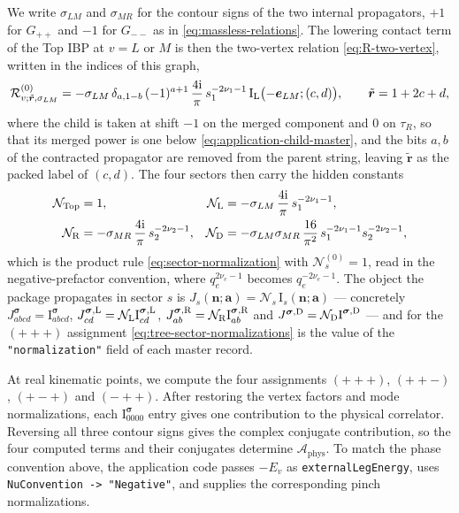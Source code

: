 \documentclass[11pt,a4paper]{article}
\newcommand{\ii}{\mathrm i}
\newcommand{\cR}{\mathcal R}
\newcommand{\cN}{\mathcal N}
\begin{document}
We write $\sigma_{LM}$ and $\sigma_{MR}$ for the contour signs of the two internal propagators,
$+1$ for $G_{++}$ and $-1$ for $G_{--}$ as in \eqref{eq:massless-relations}. The lowering contact
term of the Top IBP at $v=L$ or $M$ is then the two-vertex relation \eqref{eq:R-two-vertex},
written in the indices of this graph,
\begin{equation}
  \cR^{(0)}_{v;\tilde{\bm r},\sigma_{LM}}
  =-\sigma_{LM}\,\delta_{a,1-b}\,(-1)^{a+1}\,\frac{4\ii}{\pi}\,s_1^{-2\nu_1-1}\,
   \text{I}_{\rm L}\bigl(-\bm e_{LM};(c,d)\bigr),
  \qquad \tilde{\bm r}=1+2c+d,
  \label{eq:tree-contact-term}
\end{equation}
where the child is taken at shift $-1$ on the merged component and $0$ on $\tau_R$, so that its
merged power is one below \eqref{eq:application-child-master}, and the bits $a,b$ of the contracted
propagator are removed from the parent string, leaving $\tilde{\bm r}$ as the packed label of $(c,d)$.
The four sectors then carry the hidden constants
\begin{equation}
  \begin{aligned}
  \cN_{\rm Top}&=1, & \cN_{\rm L}&=-\sigma_{LM}\,\frac{4\ii}{\pi}\,s_1^{-2\nu_1-1},\\
  \cN_{\rm R}&=-\sigma_{MR}\,\frac{4\ii}{\pi}\,s_2^{-2\nu_2-1}, &
  \cN_{\rm D}&=-\sigma_{LM}\sigma_{MR}\,\frac{16}{\pi^2}\,s_1^{-2\nu_1-1}s_2^{-2\nu_2-1},
  \end{aligned}
  \label{eq:tree-sector-normalizations}
\end{equation}
which is the product rule \eqref{eq:sector-normalization} with $\cN_s^{(0)}=1$, read in the
negative-prefactor convention, where $q_e^{2\nu_e-1}$ becomes $q_e^{-2\nu_e-1}$. The object the
package propagates in sector $s$ is $J_s(\bm n;\bm a)=\cN_s\,\text{I}_s(\bm n;\bm a)$ ---
concretely $J^{\boldsymbol\sigma}_{abcd}=\text{I}^{\boldsymbol\sigma}_{abcd}$,
$J^{\boldsymbol\sigma,{\rm L}}_{cd}=\cN_{\rm L}\text{I}^{\boldsymbol\sigma,{\rm L}}_{cd}$,
$J^{\boldsymbol\sigma,{\rm R}}_{ab}=\cN_{\rm R}\text{I}^{\boldsymbol\sigma,{\rm R}}_{ab}$ and
$J^{\boldsymbol\sigma,{\rm D}}=\cN_{\rm D}\text{I}^{\boldsymbol\sigma,{\rm D}}$ --- and for the
$(+++)$ assignment \eqref{eq:tree-sector-normalizations} is the value of the
\texttt{"normalization"} field of each master record.

At real kinematic points, we compute the four assignments
$(+++)$, $(++-)$, $(+-+)$ and $(-++)$.
After restoring the vertex factors and mode normalizations, each
$\text{I}^{\boldsymbol\sigma}_{0000}$ entry gives one contribution to the physical correlator.
Reversing all three contour signs gives the complex conjugate contribution, so the four computed
terms and their conjugates determine $\mathcal A_{\mathrm{phys}}$.
To match the phase convention above, the application code passes $-E_v$ as \texttt{externalLegEnergy}, uses \texttt{NuConvention -> "Negative"}, and supplies the corresponding pinch normalizations.
\end{document}
